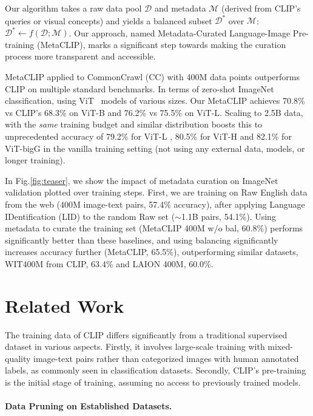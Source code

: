 \documentclass{article} %
\begin{document}
Our algorithm takes a raw data pool $\mathcal{D}$ and metadata $\mathcal{M}$ (derived from CLIP's queries or visual concepts) and yields a balanced subset $\mathcal{D}^*$ over $\mathcal{M}$: $\mathcal{D}^* \leftarrow f(\mathcal{D}; \mathcal{M})$. Our approach, named Metadata-Curated Language-Image Pre-training (MetaCLIP), marks a significant step towards making the curation process more transparent and accessible.

MetaCLIP applied to CommonCrawl (CC) with 400M data points outperforms CLIP on multiple standard benchmarks. 
In terms of zero-shot ImageNet classification, using ViT~\citep{dosovitskiy2020image} models of various sizes.
Our MetaCLIP achieves 70.8\% vs CLIP's 68.3\% on ViT-B and 76.2\% vs 75.5\% on ViT-L. 
Scaling to 2.5B data, with the \textit{same} training budget and similar distribution boosts this to unprecedented accuracy of 79.2\% for ViT-L , 80.5\% for ViT-H and 82.1\% for ViT-bigG in the vanilla training setting (not using any external data, models, or longer training).

In Fig.\ref{fig:teaser}, we show the impact of metadata curation on ImageNet validation plotted over training steps. First, we are training on Raw English data from the web (400M image-text pairs, 57.4\% accuracy), after applying Language IDentification (LID) to the random Raw set ($\sim$1.1B pairs, 54.1\%). Using metadata to curate the training set (MetaCLIP 400M w/o bal, 60.8\%) performs significantly better than these baselines, and using balancing significantly increases accuracy further (MetaCLIP, 65.5\%), outperforming similar datasets, WIT400M from CLIP, 63.4\% and LAION 400M, 60.0\%\citep{schuhmann2021laion}.  

\section{Related Work}
\label{sec:related_work}

The training data of CLIP differs significantly from a traditional supervised dataset \citep{gadre2023datacomp} in various aspects. Firstly, it involves large-scale training with mixed-quality image-text pairs rather than categorized images with human annotated labels, as commonly seen in classification datasets. Secondly, CLIP's pre-training is the initial stage of training, assuming no access to previously trained models.

\paragraph{Data Pruning on Established Datasets.}
\end{document}

